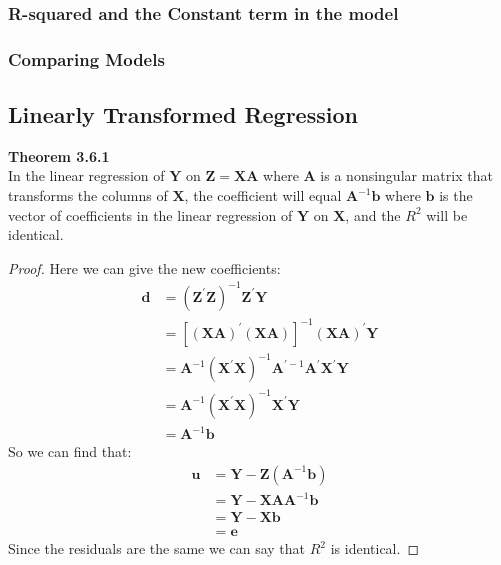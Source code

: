 \documentclass{article}
\begin{document}
\subsubsection{R-squared and the Constant term in the model}

\subsubsection{Comparing Models}


\subsection{Linearly Transformed Regression}
\textbf{Theorem 3.6.1}\\
In the linear regression of $\boldsymbol{Y}$ on $\boldsymbol{Z} = \boldsymbol{X} \boldsymbol{A}$ where $\boldsymbol{A}$ is a nonsingular matrix that transforms the columns of $\boldsymbol{X}$, the coefficient will equal $\boldsymbol{A}^{-1} \boldsymbol{b}$ where $\boldsymbol{b}$ is the vector of coefficients in the linear regression of $\boldsymbol{Y}$ on $\boldsymbol{X}$, and the $R^2$ will be identical.
	\begin{proof}
		Here we can give the new coefficients:
			\begin{align*}
				\boldsymbol{d} &= (\boldsymbol{Z}^\prime \boldsymbol{Z})^{-1} \boldsymbol{Z}^\prime \boldsymbol{Y}\\
				&= [(\boldsymbol{X} \boldsymbol{A})^\prime (\boldsymbol{X} \boldsymbol{A})]^{-1} (\boldsymbol{X} \boldsymbol{A})^\prime \boldsymbol{Y}\\
				&= \boldsymbol{A}^{-1} (\boldsymbol{X}^\prime \boldsymbol{X})^{-1} \boldsymbol{A}^{\prime -1} \boldsymbol{A}^\prime \boldsymbol{X}^\prime \boldsymbol{Y}\\
				&= \boldsymbol{A}^{-1} (\boldsymbol{X}^\prime \boldsymbol{X})^{-1} \boldsymbol{X}^\prime \boldsymbol{Y}\\
				&= \boldsymbol{A}^{-1} \boldsymbol{b}
			\end{align*}
		So we can find that:
			\begin{align*}
				\boldsymbol{u} &= \boldsymbol{Y} - \boldsymbol{Z}(\boldsymbol{A}^{-1} \boldsymbol{b})\\
				&= \boldsymbol{Y} - \boldsymbol{X} \boldsymbol{A} \boldsymbol{A}^{-1} \boldsymbol{b}\\
				&= \boldsymbol{Y} - \boldsymbol{X} \boldsymbol{b}\\
				&= \boldsymbol{e}
			\end{align*}
		Since the residuals are the same we can say that $R^2$ is identical.
	\end{proof}
\end{document}
